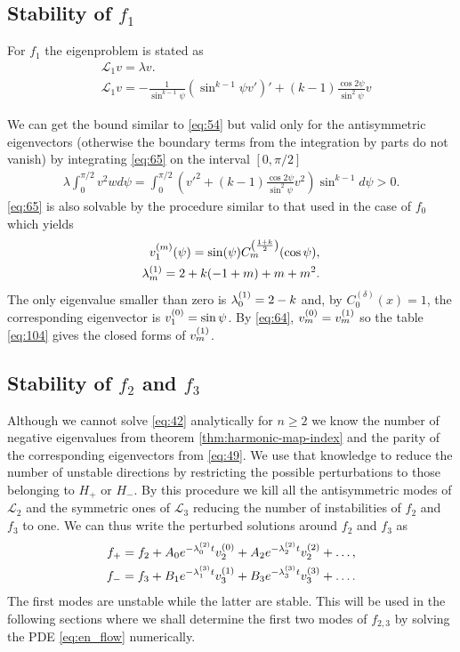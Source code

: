 \subsection{Stability of $f_1$}
\label{sec:stability-f_1}

For $f_1$ the eigenproblem is stated as
\begin{align}
  \label{eq:65}
  &\mathcal{L}_1 v = \lambda v. \\
  \label{eq:66}
  &\mathcal{L}_1 v = -\frac{1}{\sin^{k-1}\psi}\left(\sin^{k-1}\psi
    v'\right)'+(k-1)\frac{\cos2\psi}{\sin^2\psi}v
\end{align}

We can get the bound similar to \eqref{eq:54} but valid only for the
antisymmetric eigenvectors (otherwise the boundary terms from the
integration by parts do not vanish) by integrating \eqref{eq:65} on
the interval $[0,\pi/2]$
\begin{align}
  \label{eq:f1_lambda}
  \lambda\int_0^{\pi/2} v^2w
  d\psi=\int_0^{\pi/2}\left(v'^2+(k-1)\frac{\cos2\psi}{\sin^2\psi}v^2\right)\sin^{k-1}d\psi>0.
\end{align}
\eqref{eq:65} is also solvable by the procedure similar to that used
in the case of $f_0$ which yields
\begin{align}
  \label{eq:67}
  \vn{1}{m}(\psi)=\sin(\psi)C^{\left(\frac{1+k}{2}\right)}_m(\cos\psi), \\
  \label{eq:68}
  \lb{1}{m}=2 + k (-1 + m) + m + m^2.
\end{align}
The only eigenvalue smaller than zero is $\lb{1}{0}=2-k$ and, by
$C^{(\delta)}_0(x)=1$, the corresponding eigenvector is
$\vn{1}{0}=\sin\psi$. By \eqref{eq:64}, $\vn{m}{0}=\vn{m}{1}$ so the
table \eqref{eq:104} gives the closed forms of $\vn{m}{1}$.

\subsection{Stability of $f_2$ and $f_3$}
\label{sec:stability-f_2-f_3}

Although we cannot solve \eqref{eq:42} analytically for $n\ge2$ we
know the number of negative eigenvalues from theorem
\ref{thm:harmonic-map-index} and the parity of the corresponding
eigenvectors from \eqref{eq:49}. We use that knowledge to reduce the
number of unstable directions by restricting the possible
perturbations to those belonging to $H_+$ or $H_-$. By this procedure
we kill all the antisymmetric modes of $\mathcal{L}_2$ and the
symmetric ones of $\mathcal{L}_3$ reducing the number of instabilities
of $f_2$ and $f_3$ to one. We can thus write the perturbed solutions
around $f_2$ and $f_3$ as
\begin{align}
  \label{eq:69}
  f_+=f_2+A_0e^{-\lb{2}{0}t}\vn{2}{0}+A_2e^{-\lb{2}{2}t}\vn{2}{2}+\dots,\\
  \label{eq:70}
  f_-=f_3+B_1e^{-\lb{3}{1}t}\vn{3}{1}+B_3e^{-\lb{3}{3}t}\vn{3}{3}+\dots.
\end{align}
The first modes are unstable while the latter are stable. This will be
used in the following sections where we shall determine the first two
modes of $f_{2,3}$ by solving the PDE \eqref{eq:en_flow} numerically.


